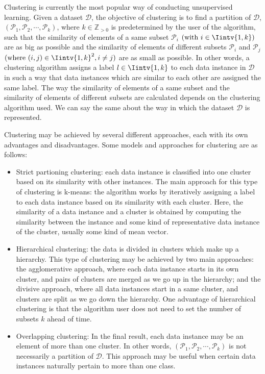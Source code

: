 Clustering is currently the most popular way of conducting unsupervised learning. 
Given a dataset $\mathcal D$, the objective of clustering is to find a partition of $\mathcal D$, $(\mathcal P_1, \mathcal P_2, \cdots, \mathcal P_k)$, where $k \in \mathbb Z_{>0}$ is predetermined by the user of the algorithm, such that the similarity of elements of a same subset $\mathcal P_i$  $(\text{with } i \in \Iintv{1,k})$ are as big as possible and the similarity of elements of different subsets $\mathcal P_i$ and $\mathcal P_j$ $(\text{where } (i,j) \in \Iintv{1,k}^2, i \ne j)$ are as small as possible. 
In other words, a clustering algorithm assigns a label $l \in \Iintv{1,k}$ to each data instance in $\mathcal D$ in such a way that data instances which are similar to each other are assigned the same label.
The way the similarity of elements of a same subset and the similarity of elements of different subsets are calculated depends on the clustering algorithm used. 
We can say the same about the way in which the dataset $\mathcal D$ is represented.

Clustering may be achieved by several different approaches, each with its own advantages and disadvantages.
Some models and approaches for clustering are as follows:
\begin{itemize}
   \item Strict partioning clustering: each data instance is classified into one cluster based on its similarity with other instances.
      The main approach for this type of clustering is k-means: the algorithm works by iteratively assigning a label to each data instance based on its similarity with each cluster.
      Here, the similarity of a data instance and a cluster is obtained by computing the similarity between the instance and some kind of representative data instance of the cluster, usually some kind of mean vector.
   \item Hierarchical clustering: the data is divided in clusters which make up a hierarchy.
      This type of clustering may be achieved by two main approaches: the agglomerative approach, where each data instance starts in its own cluster, and pairs of clusters are merged as we go up in the hierarchy; and the divisive approach, where all data instances start in a same cluster, and clusters are split as we go down the hierarchy.
      One advantage of hierarchical clustering is that the algorithm user does not need to set the number of subsets $k$ ahead of time.
   \item Overlapping clustering: In the final result, each data instance may be an element of more than one cluster.
      In other words, $(\mathcal P_1, \mathcal P_2, \cdots, \mathcal P_k)$ is not necessarily a partition of $\mathcal D$.
      This approach may be useful when certain data instances naturally pertain to more than one class.
\end{itemize}

